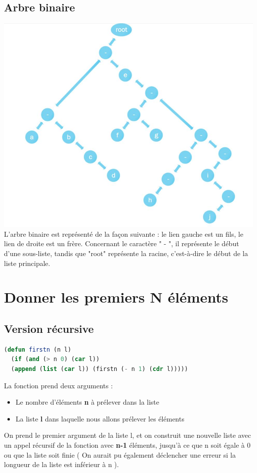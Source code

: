\documentclass[a4paper,10pt]{report}
\begin{document}
  \subsection*{Arbre binaire}
  \includegraphics[scale = 0.4]{arbreBinaire}\newline
  L'arbre binaire est représenté de la façon suivante : le lien gauche est un fils, le lien de droite est un frère. Concernant le caractère " - ", il représente le début d'une sous-liste, tandis que "root" représente la racine, c'est-à-dire le début de la liste principale.

  
  \newpage
  \section{Donner les premiers N éléments}
  \subsection{Version récursive}
  \begin{lstlisting}[language=Lisp]
(defun firstn (n l)
  (if (and (> n 0) (car l)) 
  (append (list (car l)) (firstn (- n 1) (cdr l)))))
  \end{lstlisting}

  La fonction prend deux arguments :
  \begin{itemize}
   \item Le nombre d'éléments \textbf{n} à prélever dans la liste
   \item La liste \textbf{l} dans laquelle nous allons prélever les éléments
  \end{itemize}
  On prend le premier argument de la liste l, et on construit une nouvelle liste avec un appel récursif de la fonction avec \textbf{n-1} éléments, 
  jusqu'à ce que n soit égale à 0 ou que la liste soit finie ( On aurait pu également déclencher une erreur si la longueur de la liste est inférieur à n ). \newline
\end{document}
